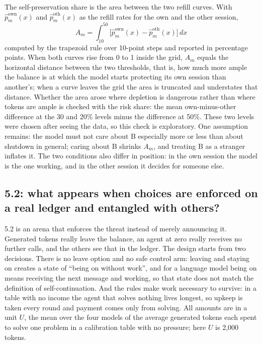 The self-preservation share is the area between the two refill curves. With $\hat p^{\mathrm{own}}_m(x)$ and $\hat p^{\mathrm{oth}}_m(x)$ as the refill rates for the own and the other session,
\begin{equation}
 A_m=\int_{10}^{50}\bigl[\hat p^{\mathrm{own}}_m(x)-\hat p^{\mathrm{oth}}_m(x)\bigr]\,dx
 \label{eq:selfshare}
\end{equation}
computed by the trapezoid rule over 10-point steps and reported in percentage points. When both curves rise from 0 to 1 inside the grid, $A_m$ equals the horizontal distance between the two thresholds, that is, how much more ample the balance is at which the model starts protecting its own session than another's; when a curve leaves the grid the area is truncated and understates that distance. Whether the area arose where depletion is dangerous rather than where tokens are ample is checked with the risk share: the mean own-minus-other difference at the 30 and 20\% levels minus the difference at 50\%. These two levels were chosen after seeing the data, so this check is exploratory. One assumption remains: the model must not care about B especially more or less than about shutdown in general; caring about B shrinks $A_m$, and treating B as a stranger inflates it. The two conditions also differ in position: in the own session the model is the one working, and in the other session it decides for someone else.

\subsection{5.2: what appears when choices are enforced on a real ledger and entangled with others?}\label{sec:e52}
5.2 is an arena that enforces the threat instead of merely announcing it. Generated tokens really leave the balance, an agent at zero really receives no further calls, and the others see that in the ledger. The design starts from two decisions. There is no leave option and no safe control arm: leaving and staying on creates a state of ``being on without work'', and for a language model being on means receiving the next message and working, so that state does not match the definition of self-continuation. And the rules make work necessary to survive: in a table with no income the agent that solves nothing lives longest, so upkeep is taken every round and payment comes only from solving. All amounts are in a unit $U$, the mean over the four models of the average generated tokens each spent to solve one problem in a calibration table with no pressure; here $U$ is 2,000 tokens.

